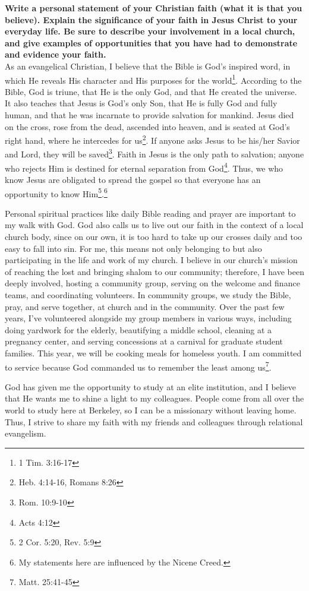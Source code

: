\documentclass{article}
\begin{document}
	
\pagestyle{plain}

\textbf{Write a personal statement of your Christian faith (what it is that you believe). Explain the significance of your faith in Jesus Christ to your everyday life. Be sure to describe your involvement in a local church, and give examples of opportunities that you have had to demonstrate and evidence your faith.}\\

As an evangelical Christian, I believe that the Bible is God's inspired word, in which He reveals His character and His purposes for the world\footnote{1 Tim. 3:16-17}.
According to the Bible, God is triune, that He is the only God, and that He created the universe.
It also teaches that Jesus is God's only Son, that He is fully God and fully human, and that he was incarnate to provide salvation for mankind.  
Jesus died on the cross, rose from the dead, ascended into heaven, and is seated at God's right hand, where he intercedes for us\footnote{Heb. 4:14-16, Romans 8:26}. 
If anyone asks Jesus to be his/her Savior and Lord, they will be saved\footnote{Rom. 10:9-10}.
Faith in Jesus is the only path to salvation; anyone who rejects Him is destined for eternal separation from God\footnote{Acts 4:12}.  
Thus, we who know Jesus are obligated to spread the gospel so that everyone has an opportunity to know Him\footnote{2 Cor. 5:20, Rev. 5:9}.\footnote{My statements here are influenced by the Nicene Creed.}

Personal spiritual practices like daily Bible reading and prayer are important to my walk with God.
God also calls us to live out our faith in the context of a local church body, since on our own, it is too hard to take up our crosses daily and too easy to fall into sin.
For me, this means not only belonging to but also participating in the life and work of my church.  
I believe in our church's mission of reaching the lost and bringing shalom to our community; therefore, I have been deeply involved, hosting a community group, serving on the welcome and finance teams, and coordinating volunteers.
In community groups, we study the Bible, pray, and serve together, at church and in the community.  
Over the past few years, I've volunteered alongside my group members in various ways, including doing yardwork for the elderly, beautifying a middle school, cleaning at a pregnancy center, and serving concessions at a carnival for graduate student families.  This year, we will be cooking meals for homeless youth.
I am committed to service because God commanded us to remember the least among us\footnote{Matt. 25:41-45}.

God has given me the opportunity to study at an elite institution, and I believe that He wants me to shine a light to my colleagues.  People come from all over the world to study here at Berkeley, so I can be a missionary without leaving home.  Thus, I strive to share my faith with my friends and colleagues through relational evangelism.
\end{document}
